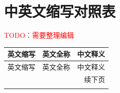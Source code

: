 \chapter{中英文缩写对照表}\label{app:abbreviations}

\textcolor{red}{TODO：需要整理编辑}

\renewcommand{\arraystretch}{1.3}

\begin{longtable}{p{2.3cm}p{7cm}p{4cm}}
	\toprule
	英文缩写   & 英文全称  & 中文释义       \\ 
	\midrule
	\endfirsthead
	
	\toprule
	英文缩写   & 英文全称  & 中文释义       \\ 
	\midrule
	\endhead
	
	\midrule
	\multicolumn{3}{r}{续下页}  \\
	\endfoot
	
	\bottomrule
	\endlastfoot
	

\end{longtable}
